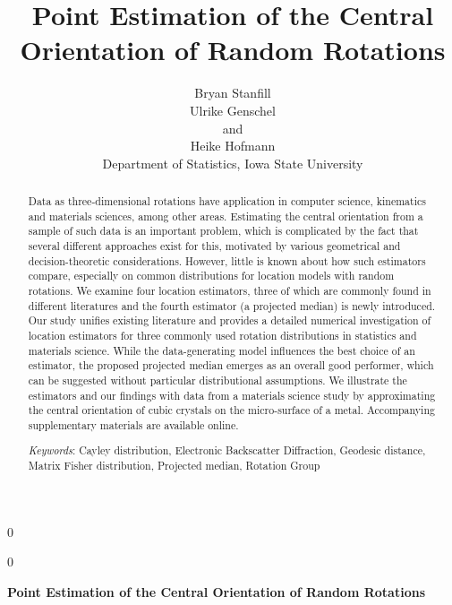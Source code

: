 \documentclass[12pt]{article}
\newcommand{\blind}{0}
\begin{document}
\def\spacingset#1{\renewcommand{\baselinestretch}%
{#1}\small\normalsize} \spacingset{1}

\blind
{
  \title{\bf Point Estimation of the Central Orientation of Random Rotations}
  \author{Bryan Stanfill\\
    Ulrike Genschel \\
    and\\
    Heike Hofmann\\
    Department of Statistics, Iowa State University\\}
  \maketitle
} \fi

\blind
{
  \bigskip
  \bigskip
  \bigskip
  \begin{center}
    {\LARGE\bf Point Estimation of the Central Orientation of Random Rotations}
\end{center}
  \medskip
} \fi



\bigskip
\begin{abstract}
Data as three-dimensional rotations have application in computer science, kinematics and materials sciences, among other areas.  Estimating the central orientation from a sample of such data is an important problem, which is complicated by the
fact that several different approaches exist for this,  motivated by various geometrical and decision-theoretic considerations. However, little is known about how such estimators compare, especially on common distributions for location models with random rotations.  We examine four location estimators, three of which are commonly found in different literatures and the
fourth estimator (a projected median) is newly introduced.  Our study unifies
existing literature and provides a detailed numerical investigation of location estimators for three commonly used rotation distributions in statistics and materials science.  While
the data-generating model influences the best choice of an estimator, the proposed projected median emerges as an overall good performer, which can be suggested
without particular distributional assumptions.  We illustrate the estimators 
and our findings with data from a materials science study by approximating the central orientation of cubic crystals on the micro-surface of a metal. Accompanying supplementary materials are available online.


\noindent\textit{Keywords}: Cayley distribution, Electronic Backscatter Diffraction, Geodesic distance, Matrix Fisher distribution, Projected median,  Rotation Group \end{abstract}
\spacingset{1.45} %
\newpage







\clearpage

%
\end{document}
